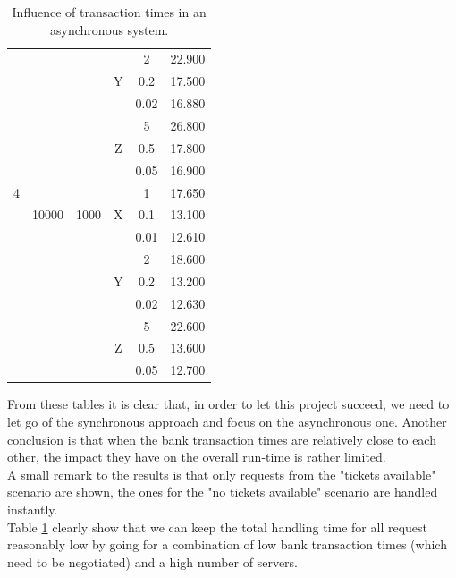 \documentclass[10pt,a4paper,twocolumn]{article}
\begin{document}
\begin{table}[!t]
{\begin{tabular}{c|c|c|c|c|c}
									&									& 								  &				   & 2 							& 22.900 \\
									&	 								& 								  & Y						& 0.2 						& 17.500\\
									&									& 								  &						& 0.02 					   & 16.880 \\\hline
									&									& 								  &				   & 5 							& 26.800 \\
									&	 								& 								  & Z						& 0.5 						& 17.800\\
									&									& 								  &						& 0.05 					   & 16.900\\\hline
	4 								&  					  			   &  								 & 					 & 1 						  & 17.650 \\
									&	10000 					   & 1000						 &	X					& 0.1 						& 13.100 \\
									&									& 								  &						& 0.01 					   & 12.610 \\\hline
									&									& 								  &				   & 2 							& 18.600 \\
									&	 								& 								  & Y						& 0.2 						& 13.200\\
									&									& 								  &						& 0.02 					   & 12.630 \\\hline
									&									& 								  &				   & 5 							& 22.600 \\
									&	 								& 								  & Z						& 0.5 						& 13.600\\
									&									& 								  &						& 0.05 					   & 12.700\\
	\end{tabular}}
	\caption{\label{tab:banking-time-influence-asynchronous}Influence of transaction times in an asynchronous system.}
\end{table}\noindent
From these tables it is clear that, in order to let this project succeed, we need to let go of the synchronous approach and focus on the asynchronous one. Another conclusion is that when the bank transaction times are relatively close to each other, the impact they have on the overall run-time is rather limited.\\
A small remark to the results is that only requests from the "tickets available" scenario are shown, the ones for the "no tickets available" scenario are handled instantly.\\
Table \ref{tab:banking-time-influence-asynchronous} clearly show that we can keep the total handling time for all request reasonably low by going for a combination of low bank transaction times (which need to be negotiated) and a high number of servers.
\end{document}
